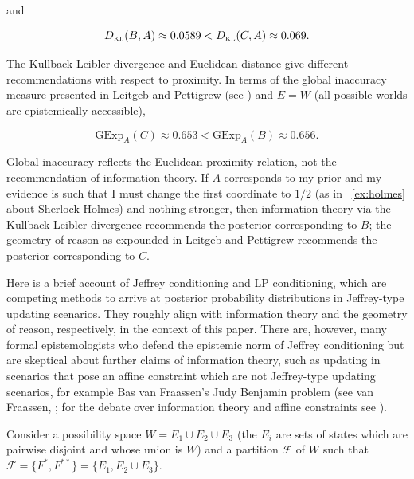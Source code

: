 \documentclass[12pt]{article}
\begin{document}
and

\begin{equation}
  \label{eq:e9}
  D_{\mbox{\tiny KL}}(B,A)\approx{}0.0589<D_{\mbox{\tiny KL}}(C,A)\approx{}0.069.
\end{equation}

The Kullback-Leibler divergence and Euclidean distance give different
re\-commendations with respect to proximity. In terms of the global
inaccuracy measure presented in Leitgeb and Pettigrew (see
) and $E=W$ (all possible worlds
are epistemically accessible),

\begin{equation}
  \label{eq:e8a}
  \mbox{GExp}_{A}(C)\approx{}0.653<\mbox{GExp}_{A}(B)\approx{}0.656.
\end{equation}

Global inaccuracy reflects the Euclidean proximity relation, not the
re\-commendation of information theory. If $A$ corresponds to my prior
and my evidence is such that I must change the first coordinate to
$1/2$ (as in {\xample}~\ref{ex:holmes} about Sherlock Holmes) and
nothing stronger, then information theory via the Kullback-Leibler
divergence re\-commends the posterior corresponding to $B$; the
geometry of reason as expounded in Leitgeb and Pettigrew recommends
the posterior corresponding to $C$.

Here is a brief account of Jeffrey conditioning and LP conditioning,
which are competing methods to arrive at posterior probability
distributions in Jeffrey-type updating scenarios. They roughly align
with information theory and the geometry of reason, respectively, in
the context of this paper. There are, however, many formal
epistemologists who defend the epistemic norm of Jeffrey conditioning
but are skeptical about further claims of information theory, such as
updating in scenarios that pose an affine constraint which are not
Jeffrey-type updating scenarios, for example Bas van Fraassen's Judy
Benjamin problem (see van Fraassen, ; for the
debate over information theory and affine constraints see
).

\begin{example}
  \label{ex:abstract}
  Consider a possibility space $W=E_{1}\cup{}E_{2}\cup{}E_{3}$ (the
  $E_{i}$ are sets of states which are pairwise disjoint and whose
  union is $W$) and a partition $\mathcal{F}$ of $W$ such that
  $\mathcal{F}=\{F^{*},F^{**}\}=\{E_{1},E_{2}\cup{}E_{3}\}$.
\end{example}
\end{document}
